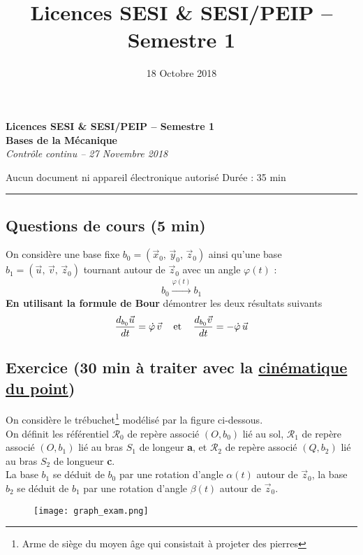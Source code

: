 \documentclass[a4paper,12pt]{article}
\title{\large{Licences SESI \& SESI/PEIP -- Semestre 1}}%
\date{\large{18 Octobre 2018}}
\begin{document}
\begin{center}
	\textbf{Licences SESI \& SESI/PEIP -- Semestre 1} \\[2mm]
	\large{\textbf{Bases de la Mécanique}} \\[1mm]
	\textit{Contrôle continu -- 27 Novembre 2018}
\end{center}
\begin{flushleft}
Aucun document ni appareil électronique autorisé \hfill Durée : 35 min
\end{flushleft}
\hrule
\vspace{2mm}
\subsection*{Questions de cours (5 min)}
On considère une base fixe $b_0 = \left(\vec{x}_0,\, \vec{y}_0,\, \vec{z}_0 \right)$ ainsi qu'une base $b_1 = \left( \vec{u},\, \vec{v},\, \vec{z}_0 \right)$ tournant autour de $\vec{z}_0$ avec un angle $\varphi(t)$ : $$ b_0 \xrightarrow{\varphi(t)} b_1 $$
\noindent \textbf{En utilisant la formule de Bour} démontrer les deux résultats suivants
	\begin{equation*}
		\frac{d_{b_0} \vec{u}}{dt} = \dot{\varphi}\, \vec{v} \text{\hspace{3mm} et \hspace{3mm}} \frac{d_{b_0} \vec{v}}{dt} = -\dot{\varphi}\, \vec{u}
	\end{equation*}
	

\subsection*{Exercice (30 min à traiter avec la \underline{cinématique du point})}
\noindent On considère le trébuchet\footnote{Arme de siège du moyen âge qui consistait à projeter des pierres} modélisé par la figure ci-dessous. \\[2mm]
On définit les référentiel $\mathcal{R}_0$ de repère associé $(O, b_0)$ lié au sol, $\mathcal{R}_1$ de repère associé $(O, b_1)$ lié au bras $S_1$ de longeur \textbf{a}, et $\mathcal{R}_2$ de repère associé $(Q, b_2)$ lié au bras $S_2$ de longueur \textbf{c}. \\[2mm]
La base $b_1$ se déduit de $b_0$ par une rotation d'angle $\alpha(t)$ autour de $\vec{z}_0$, la base $b_2$ se déduit de $b_1$ par une rotation d'angle $\beta(t)$ autour de $\vec{z}_0$.

\begin{figure}[!ht]
\centering
\texttt{[image: graph\_exam.png]}

\end{figure}
\end{document}
